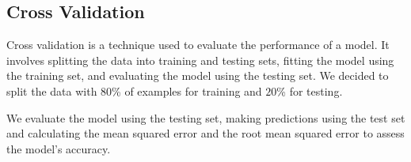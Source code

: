 \documentclass[
]{article}
\newenvironment{Shaded}{\begin{snugshade}}{\end{snugshade}}
\newcommand{\AttributeTok}[1]{\textcolor[rgb]{0.13,0.29,0.53}{#1}}
\newcommand{\ConstantTok}[1]{\textcolor[rgb]{0.56,0.35,0.01}{#1}}
\newcommand{\DecValTok}[1]{\textcolor[rgb]{0.00,0.00,0.81}{#1}}
\newcommand{\FloatTok}[1]{\textcolor[rgb]{0.00,0.00,0.81}{#1}}
\newcommand{\FunctionTok}[1]{\textcolor[rgb]{0.13,0.29,0.53}{\textbf{#1}}}
\newcommand{\NormalTok}[1]{#1}
\newcommand{\OtherTok}[1]{\textcolor[rgb]{0.56,0.35,0.01}{#1}}
\newcommand{\SpecialCharTok}[1]{\textcolor[rgb]{0.81,0.36,0.00}{\textbf{#1}}}
\newcommand{\StringTok}[1]{\textcolor[rgb]{0.31,0.60,0.02}{#1}}
\begin{document}
\subsection{Cross Validation}\label{cross-validation}

Cross validation is a technique used to evaluate the performance of a
model. It involves splitting the data into training and testing sets,
fitting the model using the training set, and evaluating the model using
the testing set. We decided to split the data with \(80\)\% of examples
for training and \(20\)\% for testing.

\begin{Shaded}
\end{Shaded}

We evaluate the model using the testing set, making predictions using
the test set and calculating the mean squared error and the root mean
squared error to assess the model's accuracy.

\begin{Shaded}
\end{Shaded}
\end{document}
